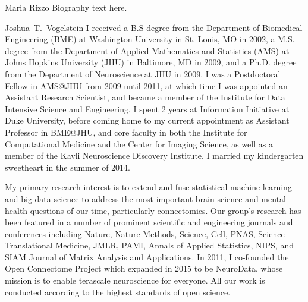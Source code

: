 \documentclass[10pt,journal,compsoc]{IEEEtran}
\begin{document}
\begin{IEEEbiographynophoto}{Maria Rizzo}
Biography text here.
\end{IEEEbiographynophoto}


\begin{IEEEbiography}{Joshua~T.~Vogelstein}
I received a B.S degree from the Department of Biomedical Engineering (BME) at Washington University in St. Louis, MO in 2002, a M.S. degree from the Department of Applied Mathematics and Statistics (AMS) at Johns Hopkins University (JHU) in Baltimore, MD in 2009, and a Ph.D. degree from the Department of Neuroscience at JHU in 2009. I was a Postdoctoral Fellow in AMS@JHU from 2009 until 2011, at which time I was appointed an Assistant Research Scientist, and became a member of the Institute for Data Intensive Science and Engineering. I spent 2 years at Information Initiative at Duke University, before coming home to my current appointment as Assistant Professor in BME@JHU, and core faculty in both the Institute for Computational Medicine and the Center for Imaging Science, as well as a member of the Kavli Neuroscience Discovery Institute. I married my kindergarten sweetheart in the summer of 2014. 

My primary research interest is to extend and fuse statistical machine learning and big data science to address the most important brain science and mental health questions of our time, particularly  connectomics. Our group’s research has been featured in a number of prominent scientific and engineering journals and conferences including Nature, Nature Methods, Science, Cell, PNAS, Science Translational Medicine, JMLR, PAMI, Annals of Applied Statistics,  NIPS, and SIAM Journal of Matrix Analysis and Applications. In 2011, I co-founded the Open Connectome Project which expanded in 2015 to be NeuroData, whose mission is to enable terascale neuroscience for everyone. All our work is conducted according to the highest standards of open science.
\end{IEEEbiography}






\end{document}
